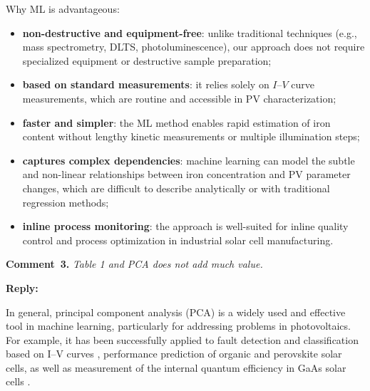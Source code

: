 \documentclass[a4paper,fleqn]{cas-sc}
\begin{document}
Why ML is advantageous:
\begin{itemize}
    \item \textbf{non-destructive and equipment-free}: unlike traditional techniques (e.g., mass spectrometry, DLTS, photoluminescence), our approach does not require specialized equipment or destructive sample preparation;
    \item \textbf{based on standard measurements}: it relies solely on $I$–$V$ curve measurements, which are routine and accessible in PV characterization;
    \item \textbf{faster and simpler}: the ML method enables rapid estimation of iron content without lengthy kinetic measurements or multiple illumination steps;
    \item \textbf{captures complex dependencies}: machine learning can model the subtle and non-linear relationships between iron concentration and PV parameter changes, which are difficult to describe analytically or with traditional regression methods;
    \item \textbf{inline process monitoring}: the approach is well-suited for inline quality control and process optimization in industrial solar cell manufacturing.
\end{itemize}
%
%
%
%
\vspace{1cm}
\noindent
\textcolor[rgb]{0.00,0.50,1.00}{\textbf{Comment~3.}}
\emph{Table 1 and PCA does not add much value.}

\noindent
\textcolor[rgb]{0.51,0.00,0.00}{\textbf{Reply:}}

In general, principal component analysis (PCA) is a widely used and effective tool in machine learning,
particularly for addressing problems in photovoltaics.
For example, it has been successfully applied to fault detection and classification based on I–V curves \cite{Fadhel2019, Gao2020},
performance prediction of organic \cite{David2021} and perovskite \cite{Liu2022} solar cells,
as well as measurement of the internal quantum efficiency in GaAs solar cells \cite{AbdullahVetter2025}.
\end{document}
